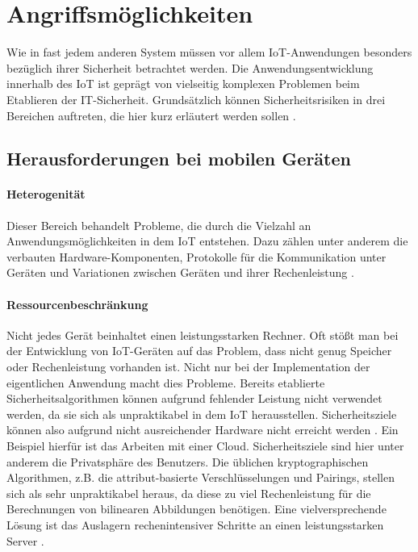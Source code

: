 \section{Angriffsmöglichkeiten}\label{sec:possible-attacks}
Wie in fast jedem anderen System müssen vor allem IoT-Anwendungen besonders
bezüglich ihrer Sicherheit betrachtet werden. Die Anwendungsentwicklung
innerhalb des IoT ist geprägt von vielseitig komplexen Problemen beim Etablieren
der IT-Sicherheit. Grundsätzlich können Sicherheitsrisiken in drei Bereichen
auftreten, die hier kurz erläutert werden sollen \cite{paper}.

\subsection{Herausforderungen bei mobilen Geräten}
\paragraph{Heterogenität}
Dieser Bereich behandelt Probleme, die durch die Vielzahl an
Anwendungsmöglichkeiten in dem IoT entstehen. Dazu zählen unter anderem
die verbauten Hardware-Komponenten, Protokolle für die Kommunikation unter
Geräten und Variationen zwischen Geräten und ihrer Rechenleistung \cite{paper}.

\paragraph{Ressourcenbeschränkung}
Nicht jedes Gerät beinhaltet einen leistungsstarken Rechner. Oft stößt man bei
der Entwicklung von IoT-Geräten auf das Problem, dass nicht genug Speicher oder
Rechenleistung vorhanden ist. Nicht nur bei der Implementation der eigentlichen
Anwendung macht dies Probleme. Bereits etablierte Sicherheitsalgorithmen können
aufgrund fehlender Leistung nicht verwendet werden, da sie sich als
unpraktikabel in dem IoT herausstellen. Sicherheitsziele können also aufgrund
nicht ausreichender Hardware nicht erreicht werden \cite{paper}. Ein Beispiel
hierfür ist das Arbeiten mit einer Cloud. Sicherheitsziele sind hier unter
anderem die Privatsphäre des Benutzers. Die üblichen kryptographischen
Algorithmen, z.B. die attribut-basierte Verschlüsselungen und Pairings, stellen
sich als sehr unpraktikabel heraus, da diese zu viel Rechenleistung für die
Berechnungen von bilinearen Abbildungen benötigen. Eine vielversprechende Lösung
ist das Auslagern rechenintensiver Schritte an einen leistungsstarken Server
\cite{phoabe}.


